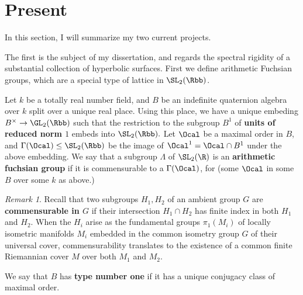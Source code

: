 \documentclass[12pt]{article}
\theoremstyle{plain}
\theoremstyle{remark}
\newtheorem{rem}{Remark}
\begin{document}
%
\section{Present}
In this section, I will summarize my two current projects.

The first is the subject of my dissertation, and regards the spectral rigidity of a substantial collection of hyperbolic surfaces. First we define arithmetic Fuchsian groups, which are a special type of lattice in $\SL_2(\Rbb)$.

Let $k$ be a totally real number field, and $B$ be an indefinite  quaternion algebra over $k$ split over a unique real place. Using this place, we have a unique embeding $B^\times \to \GL_2(\Rbb)$ such that the restriction to the subgroup $B^1$ of {\bf units of reduced norm $1$} embeds into $\SL_2(\Rbb).$ Let $\Ocal$ be a maximal order in $B$, and $\Gamma(\Ocal) \leq \SL_2(\Rbb)$ be the image of $\Ocal^1 = \Ocal \cap B^1$ under the above embedding. We say that a subgroup $\Lambda$ of $\SL_2(\R)$ is an {\bf arithmetic fuchsian group} if it is commensurable to a $\Gamma(\Ocal)$, for (some $\Ocal$ in some $B$ over some $k$ as above.)
\begin{rem}
	Recall that two subgroups $H_1,H_2$ of an ambient group $G$ are {\bf commensurable in $G$} if their intersection $H_1\cap H_2$ has finite index in both $H_1$ and $H_2$. When the $H_i$ arise as the fundamental groups $\pi_1(M_i)$ of locally isometric manifolds $M_i$ embedded in the common isometry group $G$ of their universal cover, commensurability translates to the existence of a common finite Riemannian cover $M$ over both $M_1$ and $M_2$.
\end{rem}
We say that $B$ has {\bf type number one} if it has a unique conjugacy class of maximal order.




\end{document}
